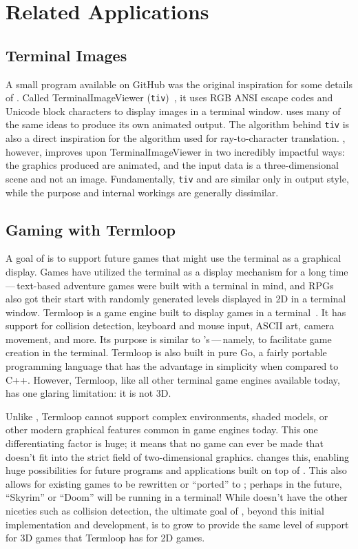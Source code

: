 \section{Related Applications}
\label{ch:relatedwork:applications}

\subsection{Terminal Images}
\label{ch:relatedwork:applications:tiv}

A small program available on GitHub was the original inspiration for some details of \name{}.
Called TerminalImageViewer (\texttt{tiv})~\cite{tivGithub}, it uses RGB ANSI escape codes and Unicode block characters to display images in a terminal window.
 \name{} uses many of the same ideas to produce its own animated output.
The algorithm behind \texttt{tiv} is also a direct inspiration for the algorithm used for ray-to-character translation.
 \name{}, however, improves upon TerminalImageViewer in two incredibly impactful ways: the graphics produced are animated, and the input data is a three-dimensional scene and not an image.
Fundamentally, \texttt{tiv} and \name{} are similar only in output style, while the purpose and internal workings are generally dissimilar.

\subsection{Gaming with Termloop}
\label{ch:relatedwork:applications:termloop}

A goal of \name{} is to support future games that might use the terminal as a graphical display.
Games have utilized the terminal as a display mechanism for a long time\,---\,text-based adventure games were built with a terminal in mind, and RPGs also got their start with randomly generated levels displayed in 2D in a terminal window.
Termloop is a game engine built to display games in a terminal~\cite{termloop}.
It has support for collision detection, keyboard and mouse input, ASCII art, camera movement, and more.
Its purpose is similar to \name{}'s\,---\,namely, to facilitate game creation in the terminal.
Termloop is also built in pure Go, a fairly portable programming language that has the advantage in simplicity when compared to C++.
However, Termloop, like all other terminal game engines available today, has one glaring limitation: it is not 3D.

Unlike \name{}, Termloop cannot support complex environments, shaded models, or other modern graphical features common in game engines today.
This one differentiating factor is huge; it means that no game can ever be made that doesn't fit into the strict field of two-dimensional graphics.
 \name{} changes this, enabling huge possibilities for future programs and applications built on top of \name{}.
This also allows for existing games to be rewritten or ``ported'' to \name{}; perhaps in the future, ``Skyrim'' or ``Doom'' will be running in a terminal!
While \name{} doesn't have the other niceties such as collision detection, the ultimate goal of \name{}, beyond this initial implementation and development, is to grow to provide the same level of support for 3D games that Termloop has for 2D games.

